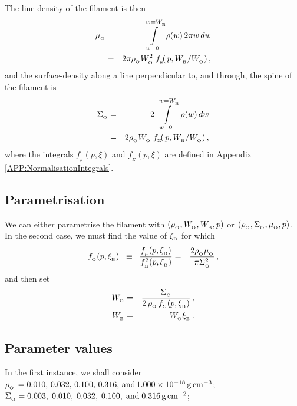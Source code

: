 \documentclass[usenatbib]{mn2e}
\newcommand{\subB}{_{_{\rm B}}}
\newcommand{\subO}{_{_{\rm O}}}
\numberwithin{equation}{section}
\begin{document}
The line-density of the filament is then 
\begin{eqnarray}\nonumber
\mu\subO&=&\int\limits_{w=0}^{w=W\subB}\rho(w)\,2\pi w\,dw\\\label{EQN:muFIL}
&=&2\pi\rho\subO W\subO^2\;f_{_\mu}\!(\,p,W\subB/W\subO)\,,
\end{eqnarray}
and the surface-density along a line perpendicular to, and through, the spine of the filament is
\begin{eqnarray}\nonumber
\Sigma\subO&=&2\,\int\limits_{w=0}^{w=W\subB}\,\rho(w)\,dw\\\label{EQN:SigmaFIL}
&=&2\rho\subO W\subO\;f_{_\Sigma}\!(\,p,W\subB/W\subO)\,,
\end{eqnarray}
where the integrals $f_{_\mu}(p,\xi)$ and $f_{_\Sigma}(p,\xi)$ are defined in Appendix \ref{APP:NormalisationIntegrals}.

\subsection{Parametrisation}

We can either parametrise the filament with $(\rho\subO,W\subO,W\subB,p)$ or $(\rho\subO,\Sigma\subO,\mu\subO,p)$. In the second case, we must find the value of $\xi\subB$ for which 
\begin{eqnarray}
f\subO(p,\xi\subB)\;\;\equiv\;\;\frac{f_{_\mu}(p,\xi\subB)}{f_{_\Sigma}^2(p,\xi\subB)}&=&\frac{2\rho\subO \mu\subO}{\pi\Sigma\subO^2}\,,
\end{eqnarray}
and then set
\begin{eqnarray}
W\subO&=&\frac{\Sigma\subO}{2\,\rho\subO\,f_{_\Sigma}(p,\xi\subB)}\,,\\
W\subB&=&W\subO\xi\subB\,.
\end{eqnarray}

\subsection{Parameter values}

In the first instance, we shall consider \\

\noindent $\rho\subO\,=0.010,\,0.032,\,0.100,\,0.316,\,{\rm and}\,1.000\times 10^{-18}\,{\rm g}\,{\rm cm}^{-3}$;\\

\noindent $\Sigma\subO=0.003,\;0.010,\;0.032,\;0.100,\;{\rm and}\;0.316\,{\rm g}\,{\rm cm}^{-2}$;\\
\end{document}
